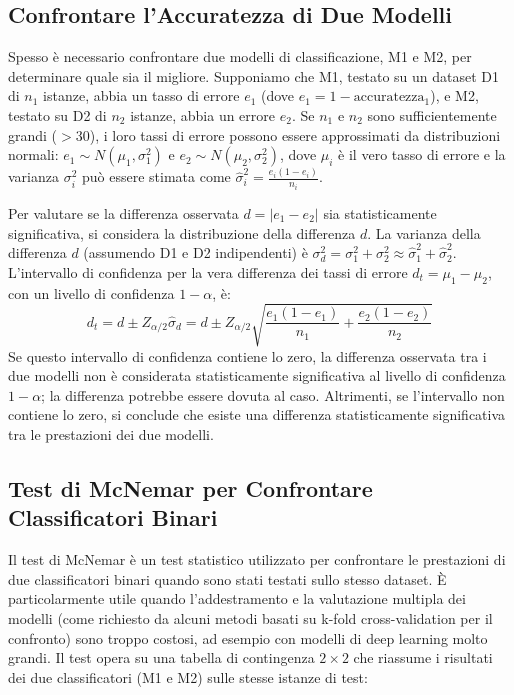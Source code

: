 \documentclass{article}
\begin{document}
\subsection{Confrontare l'Accuratezza di Due Modelli}
Spesso è necessario confrontare due modelli di classificazione, M1 e M2, per determinare quale sia il migliore. Supponiamo che M1, testato su un dataset D1 di $n_1$ istanze, abbia un tasso di errore $e_1$ (dove $e_1 = 1 - \text{accuratezza}_1$), e M2, testato su D2 di $n_2$ istanze, abbia un errore $e_2$.
Se $n_1$ e $n_2$ sono sufficientemente grandi ($>30$), i loro tassi di errore possono essere approssimati da distribuzioni normali: $e_1 \sim N(\mu_1, \sigma_1^2)$ e $e_2 \sim N(\mu_2, \sigma_2^2)$, dove $\mu_i$ è il vero tasso di errore e la varianza $\sigma_i^2$ può essere stimata come $\hat{\sigma}_i^2 = \frac{e_i(1-e_i)}{n_i}$.

Per valutare se la differenza osservata $d = |e_1 - e_2|$ sia statisticamente significativa, si considera la distribuzione della differenza $d$.  La varianza della differenza $d$ (assumendo D1 e D2 indipendenti) è $\sigma_d^2 = \sigma_1^2 + \sigma_2^2 \approx \hat{\sigma}_1^2 + \hat{\sigma}_2^2$.
L'intervallo di confidenza per la vera differenza dei tassi di errore $d_t = \mu_1 - \mu_2$, con un livello di confidenza $1-\alpha$, è:
$$ d_t = d \pm Z_{\alpha/2} \hat{\sigma}_d = d \pm Z_{\alpha/2} \sqrt{\frac{e_1(1-e_1)}{n_1} + \frac{e_2(1-e_2)}{n_2}} $$
Se questo intervallo di confidenza contiene lo zero, la differenza osservata tra i due modelli non è considerata statisticamente significativa al livello di confidenza $1-\alpha$; la differenza potrebbe essere dovuta al caso.  Altrimenti, se l'intervallo non contiene lo zero, si conclude che esiste una differenza statisticamente significativa tra le prestazioni dei due modelli.

\subsection{Test di McNemar per Confrontare Classificatori Binari}
Il test di McNemar è un test statistico utilizzato per confrontare le prestazioni di due classificatori binari quando sono stati testati sullo stesso dataset. È particolarmente utile quando l'addestramento e la valutazione multipla dei modelli (come richiesto da alcuni metodi basati su k-fold cross-validation per il confronto) sono troppo costosi, ad esempio con modelli di deep learning molto grandi.
Il test opera su una tabella di contingenza $2 \times 2$ che riassume i risultati dei due classificatori (M1 e M2) sulle stesse istanze di test:
\end{document}
